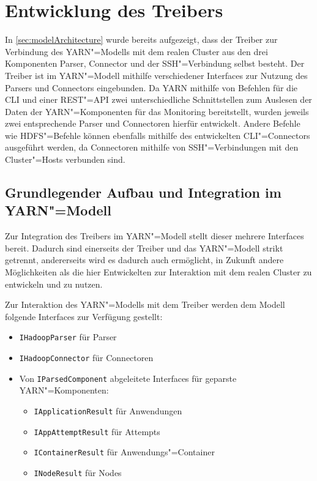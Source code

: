 \section{Entwicklung des Treibers}
\label{sec:sshDriver}

In \cref{sec:modelArchitecture} wurde bereits aufgezeigt, dass der Treiber zur Verbindung des \ac{YARN}"=Modells mit dem realen Cluster aus den drei Komponenten Parser, Connector und der SSH"=Verbindung selbst besteht.
Der Treiber ist im \ac{YARN}"=Modell mithilfe verschiedener Interfaces zur Nutzung des Parsers und Connectors eingebunden.
Da \ac{YARN} mithilfe von Befehlen für die CLI und einer REST"=API zwei unterschiedliche Schnittstellen zum Auslesen der Daten der \ac{YARN}"=Komponenten für das Monitoring bereitstellt, wurden jeweils zwei entsprechende Parser und Connectoren hierfür entwickelt.
Andere Befehle wie \zB \ac{HDFS}"=Befehle können ebenfalls mithilfe des entwickelten CLI"=Connectors ausgeführt werden, da Connectoren mithilfe von SSH"=Verbindungen mit den Cluster"=Hosts verbunden sind.

\subsection{Grundlegender Aufbau und Integration im \acs{YARN}"=Modell}
\label{subsec:driverModelIntegration}

Zur Integration des Treibers im \ac{YARN}"=Modell stellt dieser mehrere Interfaces bereit.
Dadurch sind einerseits der Treiber und das YARN"=Modell strikt getrennt, andererseits wird es dadurch auch ermöglicht, in Zukunft andere Möglichkeiten als die hier Entwickelten zur Interaktion mit dem realen Cluster zu entwickeln und zu nutzen.

Zur Interaktion des YARN"=Modells mit dem Treiber werden dem Modell folgende Interfaces zur Verfügung gestellt:

\begin{itemize}
    \item \texttt{IHadoopParser} für Parser
    \item \texttt{IHadoopConnector} für Connectoren
    \item Von \texttt{IParsedComponent} abgeleitete Interfaces für geparste YARN"=Komponenten:
    \begin{itemize}
        \item \texttt{IApplicationResult} für Anwendungen
        \item \texttt{IAppAttemptResult} für Attempts
        \item \texttt{IContainerResult} für Anwendungs"=Container
        \item \texttt{INodeResult} für Nodes
    \end{itemize}
\end{itemize}

